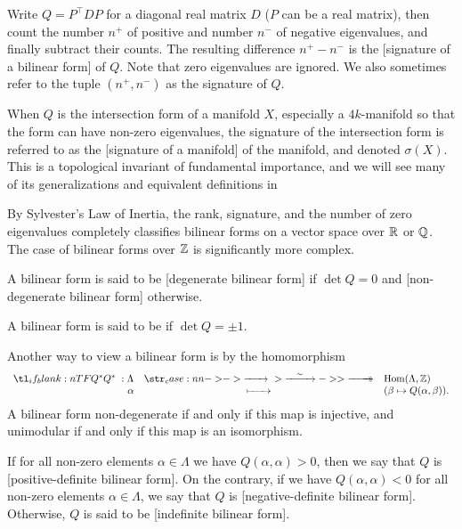 \begin{definition}[Signature]
	Write $Q=P^\intercal D P$ for a diagonal real matrix $D$ ($P$ can be a real matrix), then count the number $n^+$ of positive and number $n^-$ of negative eigenvalues, and finally subtract their counts. The resulting difference $n^+ - n^-$ is the [signature of a bilinear form] of $Q$. Note that zero eigenvalues are ignored. We also sometimes refer to the tuple $(n^+, n^-)$ as the signature of $Q$.
\end{definition}

When $Q$ is the intersection form of a manifold $X$, especially a $4k$-manifold so that the form can have non-zero eigenvalues, the signature of the intersection form is referred to as the [signature of a manifold] of the manifold, and denoted $\sigma(X)$. This is a topological invariant of fundamental importance, and we will see many of its generalizations and equivalent definitions in 

\begin{remark}
	By Sylvester's Law of Inertia, the rank, signature, and the number of zero eigenvalues completely classifies bilinear forms on a vector space over $\mathbb{R}$ or $\mathbb{Q}$. The case of bilinear forms over $\mathbb{Z}$ is significantly more complex.
\end{remark}

\begin{definition}
	A bilinear form is said to be [degenerate bilinear form] if $\det Q=0$ and [non-degenerate bilinear form] otherwise.
\end{definition}

\begin{definition}[Unimodularity]
	A bilinear form is said to be  if $\det Q=\pm 1$.
\end{definition}

Another way to view a bilinear form is by the homomorphism
\[
	\lkxfunc{Q^\d}{\Lambda}{\Hom(\Lambda, \Z)}{\alpha}{(\beta\mapsto Q(\alpha,\beta)).}
\]
A bilinear form non-degenerate if and only if this map is injective, and unimodular if and only if this map is an isomorphism.

\begin{definition}[Definiteness]
	If for all non-zero elements $\alpha\in \Lambda$ we have $Q(\alpha,\alpha)>0$, then we say that $Q$ is [positive-definite bilinear form]. On the contrary, if we have $Q(\alpha,\alpha)<0$ for all non-zero elements $\alpha\in \Lambda$, we say that $Q$ is [negative-definite bilinear form]. Otherwise, $Q$ is said to be [indefinite bilinear form].
\end{definition}

